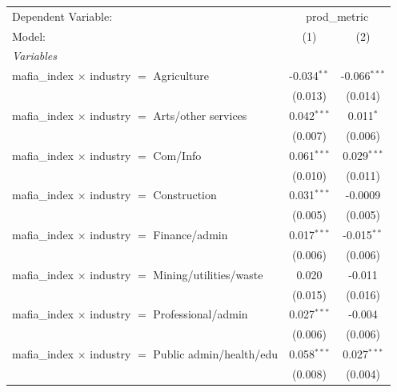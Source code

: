 
\begingroup
\centering
\begin{tabular}{lcc}
   \tabularnewline \midrule \midrule
   Dependent Variable: & \multicolumn{2}{c}{prod\_metric}\\
   Model:                                                           & (1)           & (2)\\  
   \midrule
   \emph{Variables}\\
   mafia\_index $\times$ industry $=$ Agriculture                   & -0.034$^{**}$ & -0.066$^{***}$\\   
                                                                    & (0.013)       & (0.014)\\   
   mafia\_index $\times$ industry $=$ Arts/other services           & 0.042$^{***}$ & 0.011$^{*}$\\   
                                                                    & (0.007)       & (0.006)\\   
   mafia\_index $\times$ industry $=$ Com/Info                      & 0.061$^{***}$ & 0.029$^{***}$\\   
                                                                    & (0.010)       & (0.011)\\   
   mafia\_index $\times$ industry $=$ Construction                  & 0.031$^{***}$ & -0.0009\\   
                                                                    & (0.005)       & (0.005)\\   
   mafia\_index $\times$ industry $=$ Finance/admin                 & 0.017$^{***}$ & -0.015$^{**}$\\   
                                                                    & (0.006)       & (0.006)\\   
   mafia\_index $\times$ industry $=$ Mining/utilities/waste        & 0.020         & -0.011\\   
                                                                    & (0.015)       & (0.016)\\   
   mafia\_index $\times$ industry $=$ Professional/admin            & 0.027$^{***}$ & -0.004\\   
                                                                    & (0.006)       & (0.006)\\   
   mafia\_index $\times$ industry $=$ Public admin/health/edu       & 0.058$^{***}$ & 0.027$^{***}$\\   
                                                                    & (0.008)       & (0.004)\\   

\end{tabular}

